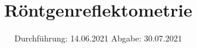 

\subject{V44}
\title{Röntgenreflektometrie}
\date{%
  Durchführung: 14.06.2021
  \hspace{3em}
  Abgabe: 30.07.2021
}



\maketitle
\thispagestyle{empty}
\tableofcontents
\newpage








\printbibliography{}


